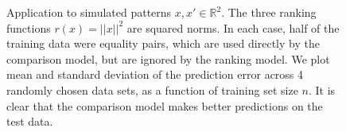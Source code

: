 \documentclass{article}
\newcommand{\RR}{\mathbb R}
\begin{document}
\begin{figure}[b!]
  \hskip -1cm
  
  \vskip -0.7cm
  \caption{Application to simulated patterns $x,x'\in\RR^2$. The three
    ranking functions $r(x)=||x||^2$ are squared norms. In each case,
    half of the training data were equality pairs, which are used
    directly by the comparison model, but are ignored by the ranking
    model. We plot mean and standard deviation of the prediction error
    across 4 randomly chosen data sets, as a function of training set
    size $n$. It is clear that the comparison model makes better
    predictions on the test data.}
  \label{fig:simulation-samples}
\end{figure}


%   

\end{document}
